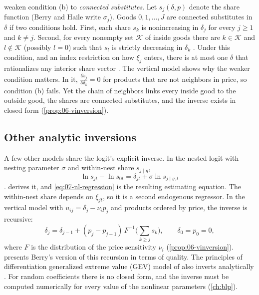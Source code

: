\citet*{BerryGandhiHaile2013} weaken condition (b) to \emph{connected substitutes}. Let $s_j(\delta, p)$
denote the share function (Berry and Haile write $\sigma_j$). Goods $0, 1, \dots, J$ are connected substitutes in
$\delta$ if two conditions hold. First, each share $s_k$ is nonincreasing in $\delta_j$ for every $j \ge 1$ and
$k \ne j$. Second, for every nonempty set $\mathcal{K}$ of inside goods there are $k \in \mathcal{K}$ and $l \notin
\mathcal{K}$ (possibly $l = 0$) such that $s_l$ is strictly decreasing in $\delta_k$ \citep[Definition~1,
p.~1759]{BerryHaile2014}. Under this condition, and an index restriction on how $\xi_j$ enters, there is at most
one $\delta$ that rationalizes any interior share vector \citep[Lemma~1, p.~1760]{BerryHaile2014}. The vertical
model shows why the weaker condition matters. In it, $\frac{\partial s_j}{\partial \delta_k} = 0$ for products
that are not neighbors in price, so condition (b) fails. Yet the chain of neighbors links every inside good to
the outside good, the shares are connected substitutes, and the inverse exists in closed form
(\cref{prop:06-vinversion}).

\subsection{Other analytic inversions}\label{sec:07-inversion-examples}

A few other models share the logit's explicit inverse. In the nested logit with nesting parameter $\sigma$ and
within-nest share $s_{j \mid g}$,
\begin{equation}\label{eq:07-nl-inversion-preview}
  \ln s_{jt} - \ln s_{0t} = \delta_{jt} + \sigma\ln s_{j \mid g, t}
\end{equation}
\citep[eq.~27]{Berry1994}.  derives it, and \eqref{eq:07-nl-regression} is the
resulting estimating equation. The within-nest share depends on $\xi_{jt}$, so it is a second endogenous
regressor. In the vertical model with $u_{ij} = \delta_j - \nu_i p_j$ and products ordered by price, the
inverse is recursive:
\begin{equation*}
  \delta_j = \delta_{j-1} + (p_j - p_{j-1})\,F^{-1}\Big(\sum_{k \ge j}s_k\Big), \qquad \delta_0 = p_0 = 0,
\end{equation*}
where $F$ is the distribution of the price sensitivity $\nu_i$ (\cref{prop:06-vinversion}).
 presents Berry's version of this recursion in terms of quality. The principles of
differentiation generalized extreme value (GEV) model of \citet{BresnahanSternTrajtenberg1997} also inverts analytically
\citep[p.~532]{Nevo2000a}. For random coefficients there is no closed form, and the inverse must be computed
numerically for every value of the nonlinear parameters (\cref{ch:blp}).

